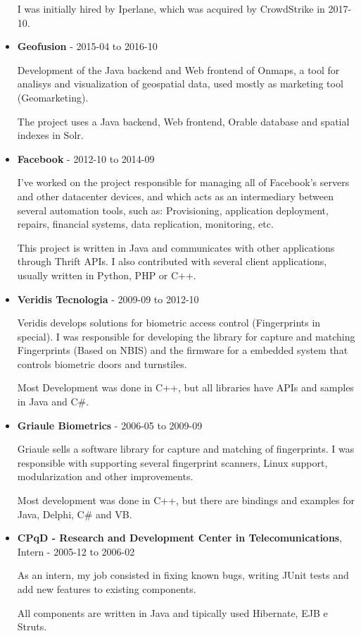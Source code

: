 \documentclass[a4paper,10pt]{article}
\begin{document}
\begin{itemize}
        I was initially hired by Iperlane, which was acquired by CrowdStrike in 2017-10.

      \item
        \textbf{Geofusion} - 2015-04 to 2016-10
        
        Development of the Java backend and Web frontend of Onmaps, a tool for analisys and visualization of geospatial data, used mostly as marketing tool (Geomarketing).
        
        The project uses a Java backend, Web frontend, Orable database and spatial indexes in Solr.

      \item
        \textbf{Facebook} - 2012-10 to 2014-09
        
        I've worked on the project responsible for managing all of Facebook's servers and other datacenter devices, and which acts as an intermediary between several automation tools, such as: Provisioning, application deployment, repairs, financial systems, data replication, monitoring, etc.
        
        This project is written in Java and communicates with other applications through Thrift APIs. I also contributed with several client applications, usually written in Python, PHP or C++.

    
      \item  
        \textbf{Veridis Tecnologia} - 2009-09 to 2012-10

        Veridis develops solutions for biometric access control (Fingerprints in special). I was responsible for developing the library for capture and  matching Fingerprints (Based on NBIS) and the firmware for a embedded system that controls biometric doors and turnstiles.
        
        Most Development was done in C++, but all libraries have APIs and samples in Java and C\#.

      \item  
        \textbf{Griaule Biometrics} - 2006-05 to 2009-09

        Griaule sells a software library for capture and matching of fingerprints. I was responsible with supporting several fingerprint scanners, Linux support, modularization and other improvements.
        
        Most development was done in C++, but there are bindings and examples for Java, Delphi, C\# and VB.

      \item
        \textbf{CPqD - Research and Development Center in Telecomunications}, Intern - 2005-12 to 2006-02

        As an intern, my job consisted in fixing known bugs, writing JUnit tests and add new features to existing components.

        All components are written in Java and tipically used Hibernate, EJB e Struts.
    \end{itemize}
\end{document}
